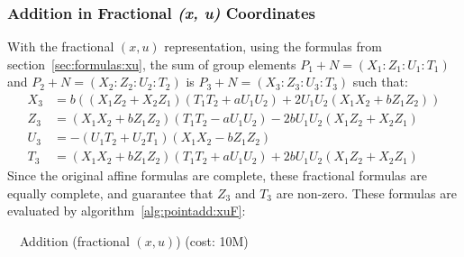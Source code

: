 \documentclass{llncs}
\begin{document}
\subsubsection{Addition in Fractional \emph{(x, u)} Coordinates}\label{sec:algorithms:xuF:add}

With the fractional $(x,u)$ representation, using the formulas from
section~\ref{sec:formulas:xu}, the sum of group elements $P_1+N =
(X_1{:}Z_1{:}U_1{:}T_1)$ and $P_2+N = (X_2{:}Z_2{:}U_2{:}T_2)$ is $P_3+N
= (X_3{:}Z_3{:}U_3{:}T_3)$ such that:
\begin{align*}
    X_3 &= b((X_1 Z_2 + X_2 Z_1)(T_1 T_2 + a U_1 U_2) + 2 U_1 U_2 (X_1 X_2 + b Z_1 Z_2)) \\
    Z_3 &= (X_1 X_2 + b Z_1 Z_2)(T_1 T_2 - a U_1 U_2) - 2b U_1 U_2 (X_1 Z_2 + X_2 Z_1) \\
    U_3 &= -(U_1 T_2 + U_2 T_1)(X_1 X_2 - b Z_1 Z_2) \\
    T_3 &= (X_1 X_2 + b Z_1 Z_2)(T_1 T_2 + a U_1 U_2) + 2b U_1 U_2 (X_1 Z_2 + X_2 Z_1)
\end{align*}
Since the original affine formulas are complete, these fractional
formulas are equally complete, and guarantee that $Z_3$ and $T_3$ are
non-zero. These formulas are evaluated by algorithm~\ref{alg:pointadd:xuF}:

\begin{algorithm}[H]
    \caption{\ \ Addition (fractional $(x,u)$) (cost: 10M)}\label{alg:pointadd:xuF}
    \begin{algorithmic}[1]
    \end{algorithmic}
\end{algorithm}
\end{document}
